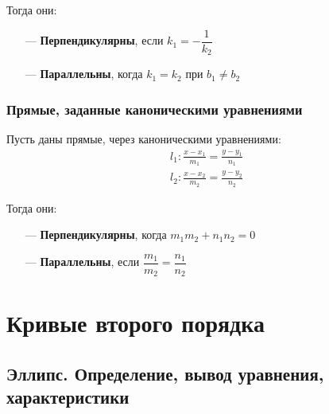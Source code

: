 \documentclass[a4paper,12pt,oneside]{extbook}
\theoremstyle{numbered}
\theoremstyle{unnumbered}
\theoremstyle{named}
\theoremstyle{unnumbered}
\theoremstyle{named}
\theoremstyle{named}
\theoremstyle{named}
\begin{document}
Тогда они:
\begin{itemize}
    \item[—]{\textbf{Перпендикулярны}, если \(k_1 = -\dfrac{1}{k_2}\)}
    \item[—]{\textbf{Параллельны}, когда \(k_1 = k_2\) при \(b_1 \neq b_2\)}
\end{itemize}

\subsection{Прямые, заданные каноническими уравнениями}
Пусть даны прямые, через каноническими уравнениями:
\begin{gather*}
    l_1: \frac{x - x_1}{m_1} = \frac{y - y_1}{n_1} \\
    l_2: \frac{x - x_2}{m_2} = \frac{y - y_2}{n_2}
\end{gather*}

Тогда они:
\begin{itemize}
    \item[—]{\textbf{Перпендикулярны}, когда \(m_1m_2 + n_1n_2 = 0\)}
    \item[—]{\textbf{Параллельны}, если \(\dfrac{m_1}{m_2} = \dfrac{n_1}{n_2}\)}
\end{itemize}

\chapter{Кривые второго порядка}%
\label{cha:Кривые второго порядка}

\section{Эллипс. Определение, вывод уравнения, характеристики}%
\label{sec:Эллипс. Определение, вывод уравнения, характеристики}
\end{document}
